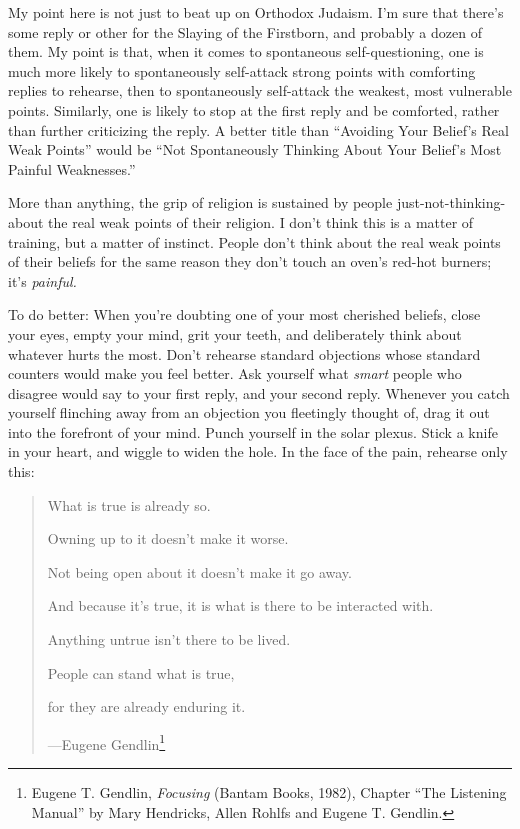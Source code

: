 {
 My point here is not just to beat up on Orthodox Judaism.
I'm sure that there's some reply or
other for the Slaying of the Firstborn, and probably a dozen of them.
My point is that, when it comes to spontaneous self-questioning, one is
much more likely to spontaneously self-attack strong points with
comforting replies to rehearse, then to spontaneously self-attack the
weakest, most vulnerable points. Similarly, one is likely to stop at
the first reply and be comforted, rather than further criticizing the
reply. A better title than ``Avoiding Your
Belief's Real Weak Points'' would be
``Not Spontaneously Thinking About Your
Belief's Most Painful Weaknesses.''}

{
 More than anything, the grip of religion is sustained by people
just-not-thinking-about the real weak points of their religion. I
don't think this is a matter of training, but a matter
of instinct. People don't think about the real weak
points of their beliefs for the same reason they don't
touch an oven's red-hot burners; it's
\textit{painful.}}

{
 To do better: When you're doubting one of your
most cherished beliefs, close your eyes, empty your mind, grit your
teeth, and deliberately think about whatever hurts the most.
Don't rehearse standard objections whose standard
counters would make you feel better. Ask yourself what \textit{smart}
people who disagree would say to your first reply, and your second
reply. Whenever you catch yourself flinching away from an objection you
fleetingly thought of, drag it out into the forefront of your mind.
Punch yourself in the solar plexus. Stick a knife in your heart, and
wiggle to widen the hole. In the face of the pain, rehearse only this:}

\label{litany_of_gendlin}

\begin{quote}
{
 What is true is already so.}

{
 Owning up to it doesn't make it worse.}

{
 Not being open about it doesn't make it go away.}

{
 And because it's true, it is what is there to be
interacted with.}

{
 Anything untrue isn't there to be lived.}

{
 People can stand what is true,}

{
 for they are already enduring it.}

{\raggedleft
 {}---Eugene Gendlin\footnote{Eugene T. Gendlin, \textit{Focusing} (Bantam Books, 1982), Chapter ``The Listening Manual'' by Mary Hendricks, Allen Rohlfs and Eugene T. Gendlin.}
 \par}
\end{quote}


